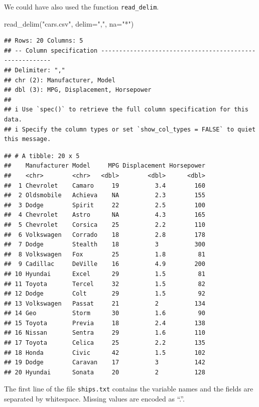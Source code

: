 \documentclass[
]{book}
\newenvironment{Shaded}{\begin{snugshade}}{\end{snugshade}}
\newcommand{\AttributeTok}[1]{\textcolor[rgb]{0.77,0.63,0.00}{#1}}
\newcommand{\FunctionTok}[1]{\textcolor[rgb]{0.00,0.00,0.00}{#1}}
\newcommand{\NormalTok}[1]{#1}
\newcommand{\StringTok}[1]{\textcolor[rgb]{0.31,0.60,0.02}{#1}}
\begin{document}
We could have also used the function \texttt{read\_delim}.

\begin{Shaded}
\begin{Highlighting}[]
\FunctionTok{read\_delim}\NormalTok{(}\StringTok{"cars.csv"}\NormalTok{, }\AttributeTok{delim=}\StringTok{","}\NormalTok{, }\AttributeTok{na=}\StringTok{"*"}\NormalTok{)}
\end{Highlighting}
\end{Shaded}

\begin{verbatim}
## Rows: 20 Columns: 5
## -- Column specification --------------------------------------------------------
## Delimiter: ","
## chr (2): Manufacturer, Model
## dbl (3): MPG, Displacement, Horsepower
## 
## i Use `spec()` to retrieve the full column specification for this data.
## i Specify the column types or set `show_col_types = FALSE` to quiet this message.
\end{verbatim}

\begin{verbatim}
## # A tibble: 20 x 5
##    Manufacturer Model     MPG Displacement Horsepower
##    <chr>        <chr>   <dbl>        <dbl>      <dbl>
##  1 Chevrolet    Camaro     19          3.4        160
##  2 Oldsmobile   Achieva    NA          2.3        155
##  3 Dodge        Spirit     22          2.5        100
##  4 Chevrolet    Astro      NA          4.3        165
##  5 Chevrolet    Corsica    25          2.2        110
##  6 Volkswagen   Corrado    18          2.8        178
##  7 Dodge        Stealth    18          3          300
##  8 Volkswagen   Fox        25          1.8         81
##  9 Cadillac     DeVille    16          4.9        200
## 10 Hyundai      Excel      29          1.5         81
## 11 Toyota       Tercel     32          1.5         82
## 12 Dodge        Colt       29          1.5         92
## 13 Volkswagen   Passat     21          2          134
## 14 Geo          Storm      30          1.6         90
## 15 Toyota       Previa     18          2.4        138
## 16 Nissan       Sentra     29          1.6        110
## 17 Toyota       Celica     25          2.2        135
## 18 Honda        Civic      42          1.5        102
## 19 Dodge        Caravan    17          3          142
## 20 Hyundai      Sonata     20          2          128
\end{verbatim}

The first line of the file \texttt{ships.txt} contains the variable names and the fields are separated by whitespace. Missing values are encoded as ``.''.
\end{document}
